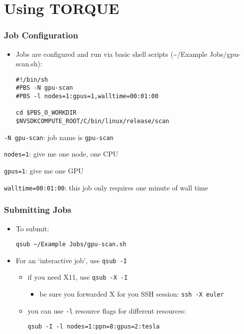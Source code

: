 \section{Using TORQUE}

\begin{frame}[fragile]\frametitle{Job Configuration}

\begin{itemize}
\item
  Jobs are configured and run via basic shell scripts
  (\textasciitilde{}/Example Jobs/gpu-scan.sh):

\begin{verbatim}
#!/bin/sh
#PBS -N gpu-scan
#PBS -l nodes=1:gpus=1,walltime=00:01:00

cd $PBS_O_WORKDIR
$NVSDKCOMPUTE_ROOT/C/bin/linux/release/scan 
\end{verbatim}
\end{itemize}

\texttt{-N gpu-scan}: job name is \texttt{gpu-scan}

\texttt{nodes=1}: give me one node, one CPU

\texttt{gpus=1}: give me one GPU

\texttt{walltime=00:01:00}: this job only requires one minute of wall
time

\end{frame}

\begin{frame}\frametitle{Submitting Jobs}

\begin{itemize}
\item
  To submit:

  \texttt{qsub \textasciitilde{}/Example Jobs/gpu-scan.sh}
\item
  For an `interactive job', use \texttt{qsub -I}

  \begin{itemize}
  \item
    if you need X11, use \texttt{qsub -X -I}

    \begin{itemize}
    \itemsep1pt\parskip0pt
    \item
      be sure you forwarded X for you SSH session: \texttt{ssh -X euler}
    \end{itemize}
  \item
    you can use \texttt{-l} resource flags for different resources:

    \texttt{qsub -I -l nodes=1:ppn=8:gpus=2:tesla}
  \end{itemize}
\end{itemize}

\end{frame}

